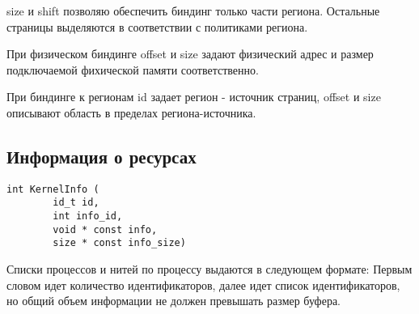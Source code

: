 size и shift позволяю обеспечить биндинг только части региона. Остальные
страницы выделяются в соответствии с политиками региона.

При физическом биндинге offset и size задают физический адрес и размер
подключаемой фихической памяти соответственно.

При биндинге к регионам id задает регион - источник страниц, offset и size
описывают область в пределах региона-источника.

\subsection{Информация о ресурсах}

\begin{verbatim}
int KernelInfo (
        id_t id,
        int info_id,
        void * const info,
        size * const info_size)
\end{verbatim}\par

Списки процессов и нитей по процессу выдаются в следующем формате: Первым словом
идет количество идентификаторов, далее идет список идентификаторов, но общий
объем информации не должен превышать размер буфера.
